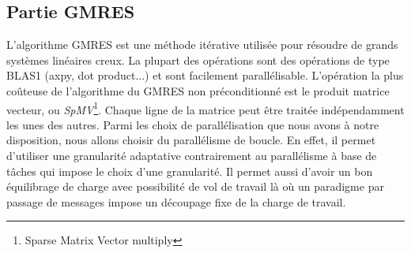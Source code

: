 \subsection{Partie GMRES}
L'algorithme GMRES est une méthode itérative utilisée pour résoudre de grands systèmes linéaires creux.
%
La plupart des opérations sont des opérations de type BLAS1 (axpy, dot product...) et sont facilement parallélisable\cite{para_blas}.
%
L'opération la plus coûteuse de l'algorithme du GMRES non préconditionné est le produit matrice vecteur, ou {\em SpMV}\footnote{Sparse Matrix Vector multiply}.
%
Chaque ligne de la matrice peut être traitée indépendamment les unes des autres.
%
Parmi les choix de parallélisation que nous avons à notre disposition, nous allons choisir du parallélisme de boucle\cite{para_spmv}.
%
En effet, il permet d'utiliser une granularité adaptative contrairement au parallélisme à base de tâches qui impose le choix d'une granularité.
%
Il permet aussi d'avoir un bon équilibrage de charge avec possibilité de vol de travail là où un paradigme par passage de messages impose un découpage fixe de la charge de travail.

